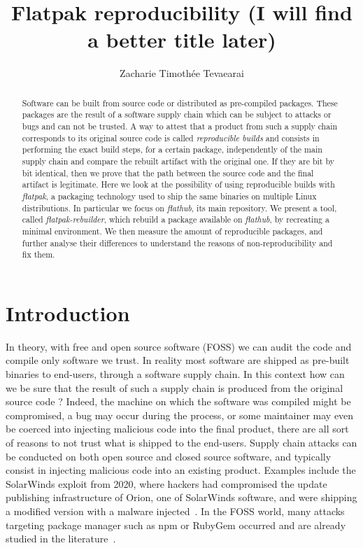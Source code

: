 \documentclass[a4paper,11pt,oneside]{report}
\title{Flatpak reproducibility (I will find a better title later)}
\author{Zacharie Timothée Tevaearai}
\theoremstyle{definition}
\newcommand{\sysname}{\emph{flatpak-rebuilder}\xspace}
\newcommand{\rb}{\emph{reproducible builds}\xspace}
\newcommand{\fp}{\emph{flatpak}\xspace}
\newcommand{\fh}{\emph{flathub}\xspace}
\begin{document}
\maketitle

\begin{abstract}
Software can be built from source code or distributed as pre-compiled packages.
    These packages are the result of a software supply chain which can be
    subject to attacks or bugs and can not be trusted. A way to attest that a
    product from such a supply chain corresponds to its original source code is
    called \rb and consists in performing the exact build steps, for a certain
    package, independently of the main supply chain and compare the rebuilt
    artifact with the original one. If they are bit by bit identical, then we
    prove that the path between the source code and the final artifact is
    legitimate. Here we look at the possibility of using reproducible builds
    with \fp, a packaging technology used to ship the same binaries on multiple
    Linux distributions. In particular we focus on \fh, its main repository. We
    present a tool, called \sysname, which rebuild a package available on \fh,
    by recreating a minimal environment. We then measure the amount of
    reproducible packages, and further analyse their differences to understand
    the reasons of non-reproducibility and fix them.
\end{abstract}

\maketoc

\chapter{Introduction}


In theory, with free and open source software (FOSS) we can audit the code and
compile only software we trust. In reality most software are shipped as
pre-built binaries to end-users, through a software supply chain. In this
context how can we be sure that the result of such a supply chain is produced
from the original source code ? Indeed, the machine on which the software was
compiled might be compromised, a bug may occur during the process, or some
maintainer may even be coerced into injecting malicious code into the final
product, there are all sort of reasons to not trust what is shipped to the
end-users. 
Supply chain attacks can be conducted on both open source and closed source
software, and typically consist in injecting malicious code into an existing
product. Examples include the SolarWinds exploit from 2020, where hackers had
compromised the update publishing infrastructure of Orion, one of SolarWinds
software, and were shipping a modified version with a malware
injected~\cite{enwiki:solarwinds}. In the FOSS world, many attacks targeting
package manager such as npm or RubyGem occurred and are already studied in the
literature~\cite{10.1007/978-3-030-52683-2_2}.
\end{document}
